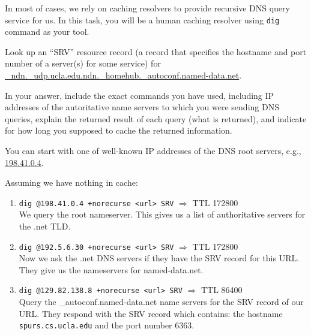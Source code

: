 \documentclass{report}
\begin{document}
\clearpage
\begin{problem}

In most of cases, we rely on caching resolvers to provide recursive DNS query
service for us. In this task, you will be a human caching resolver using
\verb|dig| command as your tool.

Look up an ``SRV'' resource record (a record that specifies the hostname and
port number of a server(s) for some service) for
\url{_ndn._udp.ucla.edu.ndn._homehub._autoconf.named-data.net}.

In your answer, include the exact commands you have used, including IP
addresses of the autoritative name servers to which you were sending DNS
queries, explain the returned result of each query (what is returned), and
indicate for how long you supposed to cache the returned information.

You can start with one of well-known IP addresses of the DNS root servers,
e.g., \url{198.41.0.4}.

\begin{answer}{30em}
  Assuming we have nothing in cache: \\
  \begin{enumerate}
  \item \texttt{dig @198.41.0.4 +norecurse <url> SRV} $\Rightarrow$ TTL 172800 \\
        We query the root nameserver. This gives us a list of authoritative
        servers for the .net TLD.

  \item \texttt{dig @192.5.6.30 +norecurse <url> SRV} $\Rightarrow$ TTL 172800 \\
        Now we ask the .net DNS servers if they have the SRV record for this
        URL. They give us the nameservers for named-data.net.

  \item \texttt{dig @129.82.138.8 +norecurse <url> SRV} $\Rightarrow$ TTL 86400 \\
        Query the \_autoconf.named-data.net name servers for the SRV record of our URL.
        They respond with the SRV record which contains: the hostname
        \texttt{spurs.cs.ucla.edu} and the port number 6363.
  \end{enumerate}
\end{answer}

\end{problem}
\end{document}
